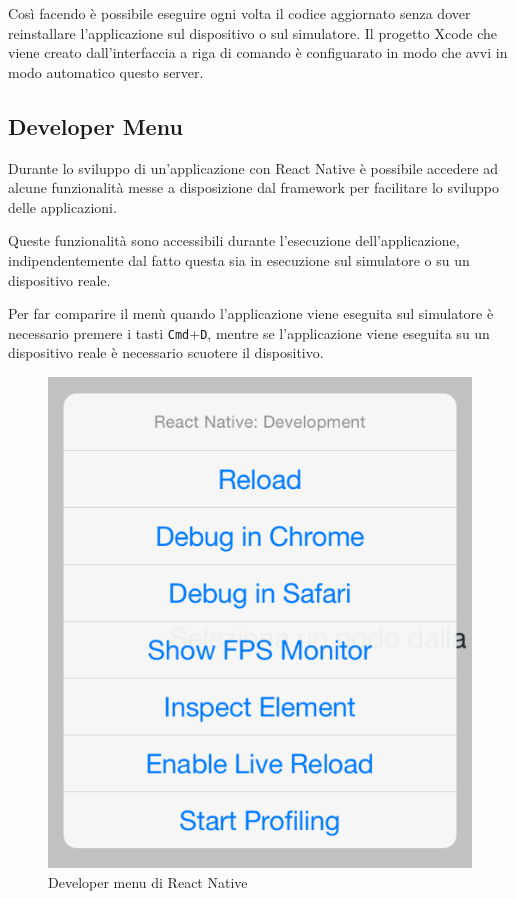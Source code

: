 Così facendo è possibile eseguire ogni volta il codice aggiornato senza dover reinstallare l'applicazione sul dispositivo o sul simulatore.
Il progetto Xcode che viene creato dall'interfaccia a riga di comando è configuarato in modo che avvi in modo automatico questo server.

\subsection{Developer Menu}

Durante lo sviluppo di un'applicazione con React Native è possibile accedere ad alcune funzionalità messe a disposizione dal framework per facilitare lo sviluppo delle applicazioni.

Queste funzionalità sono accessibili durante l'esecuzione dell'applicazione, indipendentemente dal fatto questa sia in esecuzione sul simulatore o su un dispositivo reale.

Per far comparire il menù quando l'applicazione viene eseguita sul simulatore è necessario premere i tasti \texttt{Cmd}+\texttt{D}, mentre se l'applicazione viene eseguita su un dispositivo reale è necessario scuotere il dispositivo.

\begin{figure}[htp]
\centering
\includegraphics[width=\textwidth*1/3]{../immagini/rn-devmenu}
\caption{Developer menu di React Native}  
\end{figure}

